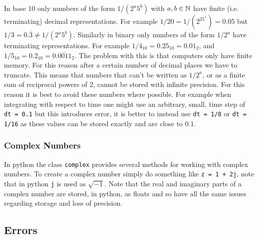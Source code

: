 \documentclass[a4paper]{article}
\begin{document}
    In base 10 only numbers of the form \(1/(2^a5^b)\) with \(a, b\in\mathbb{N}\) have finite (i.e. terminating) decimal representations.
    For example \(1/20 = 1/(2^25^1) = 0.05\) but \(1/3 = 0.\overline{3}\ne 1/(2^a5^b)\).
    Similarly in binary only numbers of the form \(1/2^a\) have terminating representations.
    For example \(1/4_{10} = 0.25_{10} = 0.01_2\), and \(1/5_{10} = 0.2_{10} = 0.\overline{0011}_2\).
    The problem with this is that computers only have finite memory.
    For this reason after a certain number of decimal places we have to truncate.
    This means that numbers that can't be written as \(1/2^a\), or as a finite sum of reciprocal powers of 2, cannot be stored with infinite precision.
    For this reason it is best to avoid these numbers where possible.
    For example when integrating with respect to time one might use an arbitrary, small, time step of \lstinline|dt = 0.1| but this introduces error, it is better to instead use \lstinline|dt = 1/8| or \lstinline|dt = 1/16| as these values can be stored exactly and are close to \(0.1\).
    
    \subsubsection{Complex Numbers}
    In python the class \lstinline|complex| provides several methods for working with complex numbers.
    To create a complex number simply do something like \lstinline|z = 1 + 2j|, note that in python \lstinline|j| is used as \(\sqrt{-1}\).
    Note that the real and imaginary parts of a complex number are stored, in python, as floats and so have all the same issues regarding storage and loss of precision.
    
    \subsection{Errors}
\end{document}
